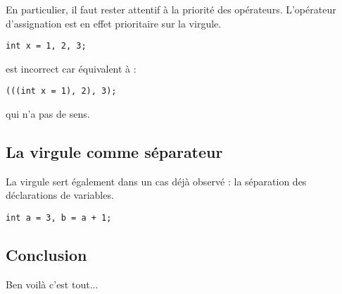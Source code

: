 \documentclass[../../../main.tex]{subfiles}
\begin{document}
En particulier, il faut rester attentif à la priorité des opérateurs. L’opérateur d’assignation est en effet
prioritaire sur la virgule.
\begin{verbatim}
int x = 1, 2, 3;
\end{verbatim}
est incorrect car équivalent à :
\begin{verbatim}
(((int x = 1), 2), 3);
\end{verbatim}
qui n’a pas de sens.
\subsection{La virgule comme séparateur}
La virgule sert également dans un cas déjà observé : la séparation des déclarations de variables.
\begin{verbatim}
int a = 3, b = a + 1;
\end{verbatim}
\subsection{Conclusion}
Ben voilà c’est tout...
\end{document}
